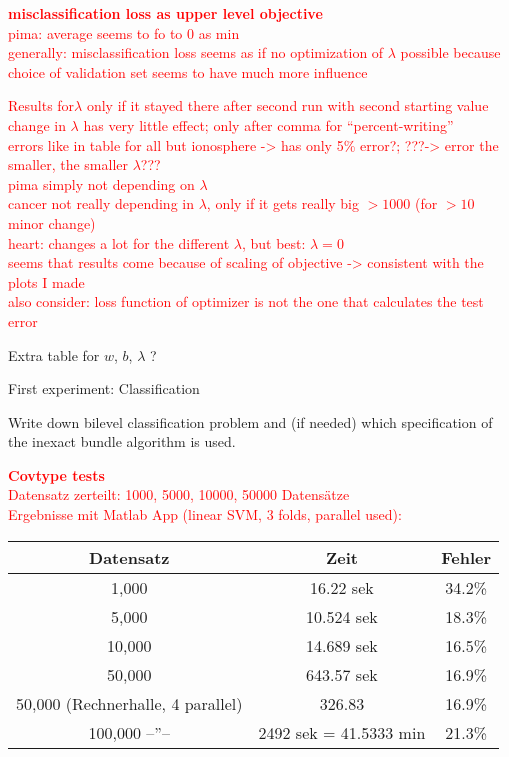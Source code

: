 \textcolor{red}{\textbf{misclassification loss as upper level objective}\\
pima: average seems to fo to 0 as min \\
generally: misclassification loss seems as if no optimization of \(\lambda\) possible because choice of validation set seems to have much more influence}

\textcolor{red}{Results for\(\lambda\) only if it stayed there after second run with second starting value\\
change in \(\lambda\) has very little effect; only after comma for ``percent-writing''\\
errors like in table for all but ionosphere -> has only 5\% error?; ???-> error the smaller, the smaller \(\lambda\)???\\
pima simply not depending on \(\lambda\)\\
cancer not really depending in \(\lambda\), only if it gets really big \(>1000\) (for \(>10\) minor change)\\
heart: changes a lot for the different \(\lambda\), but best: \(\lambda=0\)\\
seems that results come because of scaling of objective -> consistent with the plots I made\\
also consider: loss function of optimizer is not the one that calculates the test error } 


Extra table for \(w\), \(b\), \(\lambda\) ?

First experiment: Classification

Write down bilevel classification problem and (if needed) which specification of the inexact bundle algorithm is used.















\textcolor{red}{\textbf{Covtype tests}\\
Datensatz zerteilt: 1000, 5000, 10000, 50000 Datens\"atze\\
Ergebnisse mit Matlab App (linear SVM, 3 folds, parallel used):\\
\begin{tabular}{c|c|c}
Datensatz & Zeit & Fehler \\
\hline
1,000 & 16.22 sek & 34.2\% \\
5,000 & 10.524 sek & 18.3\% \\
10,000 & 14.689 sek & 16.5\% \\
50,000 &  643.57 sek & 16.9\% \\
50,000 (Rechnerhalle, 4 parallel) & 326.83 & 16.9\% \\
100,000 --''-- & 2492 sek = 41.5333 min & 21.3\%
\end{tabular}}


